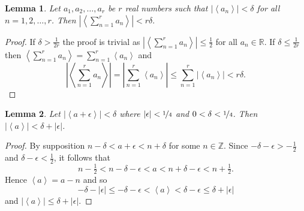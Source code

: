 \documentclass[aap,preprint]{imsart}
\newcommand{\reals}{{\mathbb R}}
\newcommand{\ints}{{\mathbb Z}}
\newcommand{\fracpart}[1]{\left\langle #1 \right\rangle}
\newcommand{\abs}[1]{\left\vert #1 \right\vert}
\newtheorem{lemma}{Lemma}
\begin{document}
 \begin{lemma} \label{lem:fracpartsumanddelta}
 Let $a_1, a_2, \dots, a_r$ be $r$ real numbers such  that $\left|\fracpart{a_n}\right| < \delta$ for all $n = 1,2,\dots,r$.  Then $\left|\fracpart{\sum_{n=1}^r{a_n}}\right| < r\delta.$
 \end{lemma}
 \begin{proof}
 If $\delta > \tfrac{1}{2r}$ the proof is trivial as $\left|\fracpart{\sum_{n=1}^r{a_n}}\right| \leq \tfrac{1}{2}$ for all $a_n \in \reals$.  If $\delta \leq \tfrac{1}{2r}$ then $\fracpart{\sum_{n=1}^r{a_n}} = \sum_{n=1}^r{\fracpart{a_n}}$ and
 \[
 \left\vert\fracpart{\sum_{n=1}^r{a_n}}\right\vert = \left\vert\sum_{n=1}^r{\fracpart{a_n}}\right\vert \leq \sum_{n=1}^r{\left\vert\fracpart{a_n}\right\vert} < r\delta.
 \]
 \end{proof}


\begin{lemma} \label{lem:fracpartinternalsumlessdelta}
Let $\left|\fracpart{a + \epsilon}\right| < \delta$ where $|\epsilon| < \nicefrac{1}{4}$ and $0<\delta<\nicefrac{1}{4}$. Then $\left|\fracpart{a}\right| < \delta + |\epsilon|$.
\end{lemma}
\begin{proof}
By supposition $n - \delta < a + \epsilon < n + \delta$ for some $n \in \ints$.  Since $-\delta - \epsilon > -\tfrac{1}{2}$ and $\delta - \epsilon < \tfrac{1}{2}$, it follows that
\[
n - \tfrac{1}{2} < n - \delta - \epsilon < a < n + \delta - \epsilon < n + \tfrac{1}{2}.
\]
Hence $\fracpart{a} = a - n$ and so
\[
-\delta - \abs{\epsilon} \leq -\delta - \epsilon < \fracpart{a} < \delta - \epsilon \leq \delta + \abs{\epsilon}
\]
and $\abs{\fracpart{a}} \leq \delta + \abs{\epsilon}$.

\end{proof}
\end{document}
